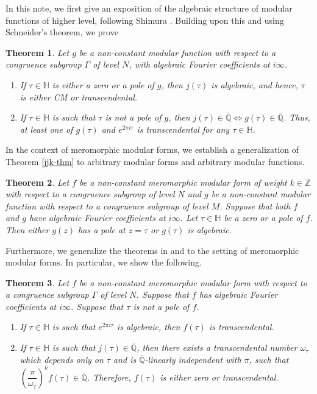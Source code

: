 \documentclass[11pt, reqno]{amsart}
\newtheorem{theorem}{Theorem}[section]
\begin{document}
In this note, we first give an exposition of the algebraic structure of modular functions of higher level, following Shimura \cite{shimura}. Building upon this and using Schneider's theorem, we prove
\begin{theorem}\label{mdf-values-thm}
Let $g$ be a non-constant modular function with respect to a congruence subgroup $\Gamma$ of level $N$, with algebraic Fourier coefficients at $i\infty$. 
\begin{enumerate}
    \item[(a)] If $\tau\in\mathbb{H}$ is either a zero or a pole of $g$, then $j(\tau)$ is algebraic, and hence, $\tau$ is either CM or transcendental.
    \item[(b)] If $\tau\in\mathbb{H}$ is such that $\tau$ is not a pole of $g$, then $j(\tau)\in\overline{\mathbb{Q}}\Leftrightarrow g(\tau)\in\overline{\mathbb{Q}}$. Thus, at least one of $g(\tau)$ and $e^{2\pi i\tau}$ is transcendental for any $\tau \in \mathbb{H}$.
\end{enumerate}
\end{theorem}


In the context of meromorphic modular forms, we establish a generalization of Theorem \ref{jjk-thm} to arbitrary modular forms and arbitrary modular functions. 
\begin{theorem}\label{zero-pole-value}
Let $f$ be a non-constant meromorphic modular form of weight $k \in \mathbb{Z}$ with respect to a congruence subgroup of level $N$ and $g$ be a non-constant modular function with respect to a congruence subgroup of level $M$. Suppose that both $f$ and $g$ have algebraic Fourier coefficients at $i\infty$. Let $\tau \in \mathbb{H}$ be a zero or a pole of $f$. Then either $g(z)$ has a pole at $z=\tau$ or $g(\tau)$ is algebraic.
\end{theorem}


Furthermore, we generalize the theorems in \cite{r-m-g} and \cite{hamieh-murty} to the setting of meromorphic modular forms. In particular, we show the following. 
\begin{theorem}\label{general-mero-values-thm}
Let $f$ be a non-constant meromorphic modular form with respect to a congruence subgroup $\Gamma$ of level $N$. Suppose that $f$ has algebraic Fourier coefficients at $i\infty$. Suppose that $\tau$ is not a pole of $f$. 
  \begin{enumerate}
      \item[(a)] If $\tau\in\mathbb{H}$ is such that $e^{2\pi i\tau}$ is algebraic, then $f(\tau)$ is transcendental.
      \item[(b)] If $\tau\in\mathbb{H}$ is such that $j(\tau)\in \overline{\mathbb{Q}}$, then there exists a transcendental number $\omega_\tau$ which depends only on $\tau$ and is $\overline{\mathbb{Q}}$-linearly independent with $\pi$, such that $\left(\dfrac{\pi}{\omega_\tau}\right)^k f(\tau)\in \overline{\mathbb{Q}}$. Therefore, $f(\tau)$ is either zero or transcendental.
  \end{enumerate}  
\end{theorem}
\end{document}
